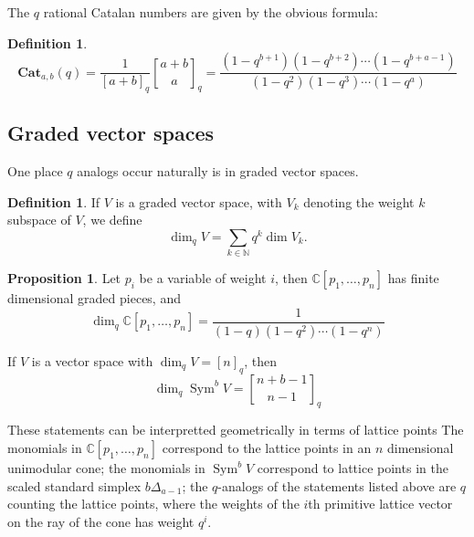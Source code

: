 \documentclass{amsart}[12pt]
\theoremstyle{definition}
\newtheorem{definition}[dummy]{Definition}
\newtheorem{proposition}[dummy]{Proposition}
\newcommand{\C}{\mathbb{C}}
\newcommand{\N}{\mathbb{N}}
\newcommand{\Cat}{\mathbf{Cat}}
\DeclareMathOperator{\Sym}{Sym}
\begin{document}
The $q$ rational Catalan numbers are given by the obvious formula:
\begin{definition}
$$\Cat_{a,b}(q)=\frac{1}{[a+b]_q} {a+b \brack a}_q=
\frac{(1-q^{b+1})(1-q^{b+2})\cdots (1-q^{b+a-1})}{(1-q^2)(1-q^3)\cdots (1-q^a)}$$
\end{definition}


\subsection{Graded vector spaces}

One place $q$ analogs occur naturally is in graded vector spaces.
\begin{definition}
If $V$ is a graded vector space, with $V_k$ denoting the weight $k$ subspace of $V$, we define $$\dim_qV=\sum_{k\in \N} q^k\dim V_k.$$
\end{definition}

\begin{proposition}
Let $p_i$ be a variable of weight $i$, then $\C[p_1,\dots, p_n]$ has
finite dimensional graded pieces, and
$$\dim_q \C[p_1,\dots, p_n]=\frac{1}{(1-q)(1-q^2)\cdots(1-q^n)}$$

If $V$ is a vector space with $\dim_qV=[n]_q$, then
$$\dim_q \Sym^b V={n+b-1 \brack n-1}_q$$
\end{proposition}

These statements can be interpretted geometrically in terms of lattice
points   The monomials in $\C[p_1,\dots, p_n]$ correspond to the lattice points in an $n$ dimensional unimodular cone; the monomials in $\Sym^b V$ correspond to lattice points in the scaled standard simplex $b\Delta_{a-1}$; the $q$-analogs of the statements listed above are $q$ counting the lattice points, where the weights of the $i$th primitive lattice vector on the ray of the cone has weight $q^i$.
\end{document}
